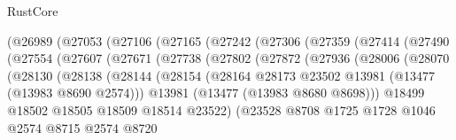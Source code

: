 \begin{lexlean}{RustCore}
\begin{coremodule}
                    (@26989
                      (@27053
                        (@27106
                          (@27165
                            (@27242
                              (@27306
                                (@27359
                                  (@27414
                                    (@27490
                                      (@27554
                                        (@27607
                                          (@27671
                                            (@27738
                                              (@27802
                                                (@27872
                                                  (@27936
                                                    (@28006
                                                      (@28070
                                                        (@28130
                                                          (@28138
                                                            (@28144
                                                              (@28154
                                                                (@28164
                                                                  @28173
                                                                  @23502
                                                                  @13981
                                                                  (@13477 (@13983 @8690 @2574)))
                                                                @13981
                                                                (@13477 (@13983 @8680 @8698)))
                                                              @18499
                                                              @18502
                                                              @18505
                                                              @18509
                                                              @18514
                                                              @23522)
                                                            (@23528
                                                              @8708
                                                              @1725
                                                              @1728
                                                              @1046
                                                              @2574
                                                              @8715
                                                              @2574
                                                              @8720

\end{coremodule}
\end{lexlean}
